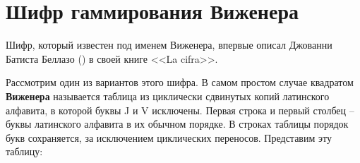 \section{Шифр гаммирования Виженера}

Шифр, который известен под именем Виженера, впервые описал Джованни Батиста Беллазо () в своей книге <<La cifra>>.

Рассмотрим один из вариантов этого шифра. В самом простом случае квадратом \textbf{Виженера} называется таблица из циклически сдвинутых копий латинского алфавита, в которой буквы J и V исключены. Первая строка и первый столбец -- буквы латинского алфавита в их обычном порядке. В строках таблицы порядок букв сохраняется, за исключением циклических переносов. Представим эту таблицу:


